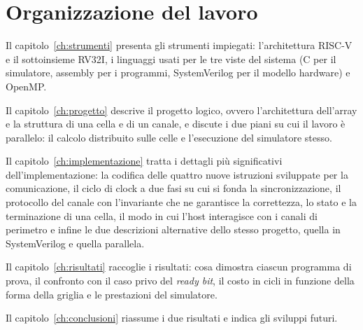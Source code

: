 \section{Organizzazione del lavoro}
\label{sec:organizzazione}

Il capitolo~\ref{ch:strumenti} presenta gli strumenti impiegati: l'architettura
RISC-V e il sottoinsieme RV32I, i linguaggi usati per le tre viste del sistema
(C per il simulatore, assembly per i programmi, SystemVerilog per il modello
hardware) e OpenMP. 

Il capitolo~\ref{ch:progetto} descrive il progetto
logico, ovvero l'architettura dell'array e la struttura di una cella e
di un canale, e discute i due piani su cui il lavoro è parallelo: il calcolo
distribuito sulle celle e l'esecuzione del simulatore stesso. 

Il capitolo~\ref{ch:implementazione} tratta i dettagli più significativi
dell'implementazione: la codifica delle quattro nuove istruzioni sviluppate per la comunicazione, il ciclo di clock a
due fasi su cui si fonda la sincronizzazione, il protocollo del canale con
l'invariante che ne garantisce la correttezza, lo stato e la terminazione di
una cella, il modo in cui l'host interagisce con i canali di perimetro e infine
le due descrizioni
alternative dello stesso progetto, quella in SystemVerilog e quella
parallela. 

Il capitolo~\ref{ch:risultati} raccoglie i
risultati: cosa dimostra ciascun programma di prova, il confronto con il caso
privo del \emph{ready bit}, il costo in cicli in funzione della forma
della griglia e le prestazioni del simulatore.\ifconclusioni{} 

Il capitolo~\ref{ch:conclusioni} riassume i due risultati e indica gli sviluppi
futuri.\fi
